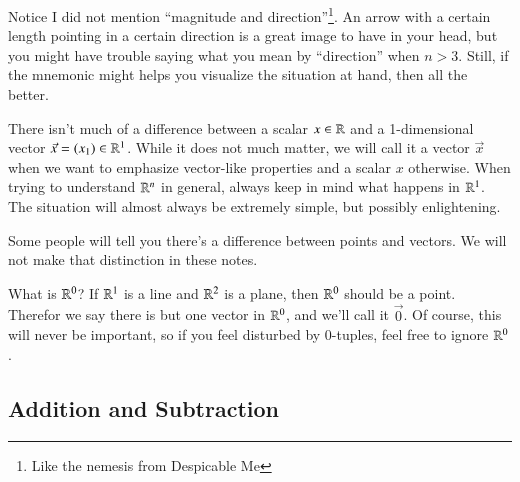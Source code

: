 \documentclass[Main.tex]{subfiles}
\begin{document}
\begin{Remark}
  Notice I did not mention ``magnitude and direction''\footnote{Like the nemesis from Despicable Me}.  
  An arrow with a certain length pointing in a certain direction is a great image to have in your head, 
  but you might have trouble saying what you mean by ``direction'' when $n>3$.  
  Still, if the mnemonic might helps you visualize the situation at hand, then all the better.
\end{Remark}

\begin{Remark}
  There isn't much of a difference between a scalar $x\in \mathbb{R}$ and a 1-dimensional vector $\vec{x}=(x_1)\in \mathbb{R}^1$.  
  While it does not much matter, we will call it a vector $\vec{x}$ when we want to emphasize vector-like properties and a scalar $x$ otherwise.  
  When trying to understand $\mathbb{R}^n$ in general, always keep in mind what happens in $\mathbb{R}^1$.  The situation will almost always be extremely simple, but possibly enlightening.  
\end{Remark}

\begin{Remark}
  Some people will tell you there's a difference between points and vectors.  We will not make that distinction in these notes.  
\end{Remark}

\begin{UnimportantRemark}
  What is $\mathbb{R}^0$?  
  If $\mathbb{R}^1$ is a line and $\mathbb{R}^2$ is a plane, then $\mathbb{R}^0$ should be a point.  
  Therefor we say there is but one vector in $\mathbb{R}^0$, and we'll call it $\vec{0}$.  
  Of course, this will never be important, so if you feel disturbed by 0-tuples, feel free to ignore $\mathbb{R}^0$.  
\end{UnimportantRemark}

\subsection{Addition and Subtraction}
\end{document}
